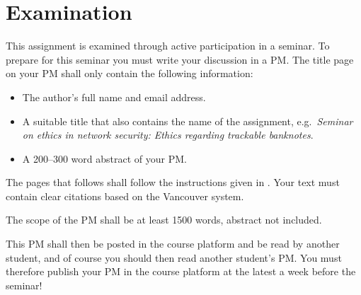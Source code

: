 \documentclass[a4paper,nocourse]{miunasgn}
\begin{document}
\section{Examination}
\label{sec:Examination}
This assignment is examined through active participation in a seminar.
To prepare for this seminar you must write your discussion in a PM.
The title page on your PM shall only contain the following information:
\begin{itemize}
  \item The author's full name and email address.
  \item A suitable title that also contains the name of the assignment, e.g.\ 
    \emph{Seminar on ethics in network security: Ethics regarding trackable 
    banknotes}.
  \item A 200--300 word abstract of your PM.
\end{itemize}

The pages that follows shall follow the instructions given in 
.
Your text must contain clear citations based on the Vancouver system. 

The scope of the PM shall be at least 1500 words, abstract not included.

This PM shall then be posted in the course platform and be read by another 
student, and of course you should then read another student's PM.
You must therefore publish your PM in the course platform at the latest a week 
before the seminar!


\printbibliography
\end{document}
